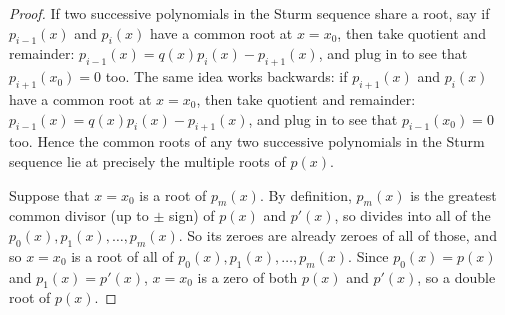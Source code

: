 \begin{proof}
If two successive polynomials in the Sturm sequence share a root, say if \(p_{i-1}(x)\) and \(p_i(x)\) have a common root at \(x=x_0\), then take quotient and remainder:
\(p_{i-1}(x) = q(x) p_i(x) - p_{i+1}(x)\), and plug in to see that \(p_{i+1}(x_0)=0\) too.
The same idea works backwards: if \(p_{i+1}(x)\) and \(p_i(x)\) have a common root at \(x=x_0\), then take quotient and remainder: \(p_{i-1}(x) = q(x) p_i(x) - p_{i+1}(x)\), and plug in to see that \(p_{i-1}(x_0)=0\) too.
Hence the common roots of any two successive polynomials in the Sturm sequence lie at precisely the multiple roots of \(p(x)\).

Suppose that \(x=x_0\) is a root of \(p_m(x)\).
By definition, \(p_m(x)\) is the greatest common divisor (up to \(\pm\) sign) of \(p(x)\) and \(p'(x)\), so divides into all of the \(p_0(x), p_1(x), \dots, p_m(x)\).
So its zeroes are already zeroes of all of those, and so \(x=x_0\) is a root of all of \(p_0(x), p_1(x), \dots, p_m(x)\).
Since \(p_0(x)=p(x)\) and \(p_1(x)=p'(x)\), \(x=x_0\) is a zero of both \(p(x)\) and \(p'(x)\), so a double root of \(p(x)\).


\end{proof}
